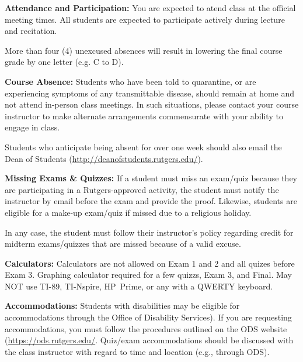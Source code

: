 \documentclass{article}
\begin{document}
\noindent \textbf{Attendance and Participation:} You are expected to atend class at the official meeting times. All students are expected to participate actively during lecture and recitation.
\par \hfill \par
\noindent More than four (4) unexcused absences will result in lowering the final course grade by one letter (e.g. C to D).
\par \hfill \par
\noindent \textbf{Course Absence:} Students who have been told to quarantine, or are experiencing symptoms of any transmittable disease, should remain at home and not attend in-person class meetings. In such situations, please contact your course instructor to make alternate arrangements commensurate with your ability to engage in class. \par \hfill \par
\noindent 
Students who anticipate being absent for over one week should also email the Dean of Students (\href{http://deanofstudents.rutgers.edu/}{http://deanofstudents.rutgers.edu/}).
\par \hfill \par
\noindent \textbf{Missing Exams \& Quizzes:} If a student must miss an exam/quiz because they are participating in a Rutgers-approved activity, the student must notify the instructor by email before the exam and provide the proof. Likewise, students are eligible for a make-up exam/quiz if missed due to a religious holiday. 
\par \hfill \par \noindent In any case, the student must follow their instructor's policy regarding credit for midterm exams/quizzes that are missed because of a valid excuse. \par
\hfill \par
\noindent \textbf{Calculators:} Calculators are not allowed on Exam 1 and 2 and all quizes before Exam 3. Graphing calculator required for a few quizzs, Exam 3, and Final. May NOT use TI-89, TI-Nspire, HP~Prime, or any with a QWERTY keyboard. \par
\hfill \par
\noindent \textbf{Accommodations:} Students with disabilities may be eligible for accommodations through the Office of Disability Services). If you are requesting accommodations, you must follow the procedures outlined on the ODS website (\href{https://ods.rutgers.edu/}{https://ods.rutgers.edu/}. Quiz/exam accommodations should be discussed with the class instructor with regard to time and location (e.g., through ODS).
\end{document}
